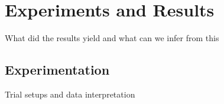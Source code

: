 

\chapter{Experiments and Results}
What did the results yield and what can we infer from this

\section{Experimentation}
Trial setups and data interpretation
